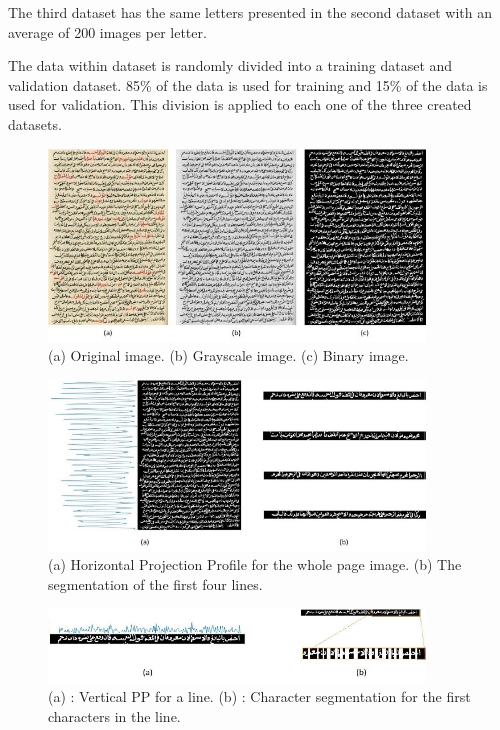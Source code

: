 \begin{itemize}[labelindent=1em,labelsep=0.25cm,leftmargin=*]
\begin{enumerate}
        The third dataset has the same letters presented in the second dataset with an average of 200 images per letter.
        \end{enumerate}
        The data within dataset is randomly divided into a training dataset and validation dataset. 85\% of the data is used for training and 15\% of the data is used for validation. This division is applied to each one of the three created datasets.
        
        
        \begin{figure}[!htb]
        \centering
        \includegraphics[width=10cm]{images/pre_cnn.png}
        \caption{(a) Original image. (b) Grayscale image. (c) Binary image.}
        \label{fig:pre_cnn}
        \end{figure}
        
        \begin{figure}[!htb]
        \centering
        \includegraphics[width=10cm]{images/line_cnn.png}
        \caption{(a) Horizontal Projection Profile for the whole page image. (b) The segmentation of the first four lines.}
        \label{fig:line_cnn}
        \end{figure}
        
        \begin{figure}[!htb]
        \centering
        \includegraphics[width=10cm]{images/char_cnn.png}
        \caption{(a) : Vertical PP for a line. (b) : Character segmentation for the first characters in the line.}
        \label{fig:char_cnn}
        \end{figure}
        

\end{itemize}
